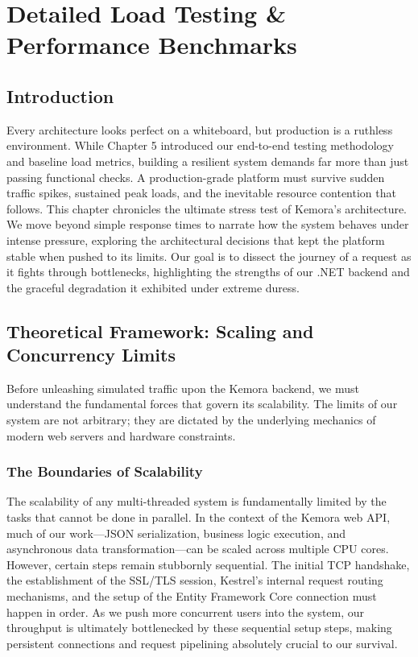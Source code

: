 \chapter{Detailed Load Testing \& Performance Benchmarks}

\section{Introduction}
Every architecture looks perfect on a whiteboard, but production is a ruthless environment. While Chapter 5 introduced our end-to-end testing methodology and baseline load metrics, building a resilient system demands far more than just passing functional checks. A production-grade platform must survive sudden traffic spikes, sustained peak loads, and the inevitable resource contention that follows. This chapter chronicles the ultimate stress test of Kemora's architecture. We move beyond simple response times to narrate how the system behaves under intense pressure, exploring the architectural decisions that kept the platform stable when pushed to its limits. Our goal is to dissect the journey of a request as it fights through bottlenecks, highlighting the strengths of our .NET backend and the graceful degradation it exhibited under extreme duress.

\section{Theoretical Framework: Scaling and Concurrency Limits}
Before unleashing simulated traffic upon the Kemora backend, we must understand the fundamental forces that govern its scalability. The limits of our system are not arbitrary; they are dictated by the underlying mechanics of modern web servers and hardware constraints.

\subsection{The Boundaries of Scalability}
The scalability of any multi-threaded system is fundamentally limited by the tasks that cannot be done in parallel. In the context of the Kemora web API, much of our work—JSON serialization, business logic execution, and asynchronous data transformation—can be scaled across multiple CPU cores. However, certain steps remain stubbornly sequential. The initial TCP handshake, the establishment of the SSL/TLS session, Kestrel's \cite{kestrel} internal request routing mechanisms, and the setup of the Entity Framework Core \cite{ef_core} connection must happen in order. As we push more concurrent users into the system, our throughput is ultimately bottlenecked by these sequential setup steps, making persistent connections and request pipelining absolutely crucial to our survival.

